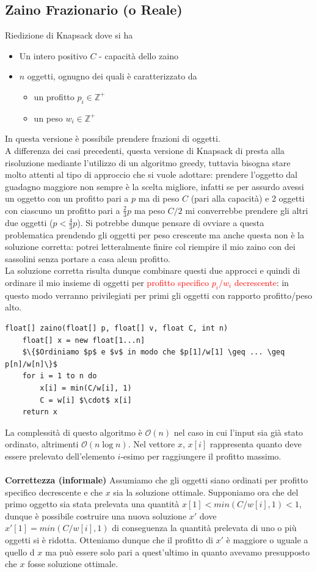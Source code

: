 \documentclass[../cheatSheetAlgoritmi.tex]{subfiles}
\begin{document}
\subsection{Zaino Frazionario (o Reale)}
Riedizione di Knapsack dove si ha
\begin{itemize}
	\item Un intero positivo $C$ - capacità dello zaino
	\item $n$ oggetti, ognugno dei quali è caratterizzato da
	\begin{itemize}
		\item un profitto $p_{i} \in \mathbb{Z}^{+}$
		\item un peso $w_{i} \in \mathbb{Z}^{+}$
	\end{itemize}
\end{itemize}
In questa versione è possibile prendere frazioni di oggetti.\\
A differenza dei casi precedenti, questa versione di Knapsack di presta alla risoluzione mediante l'utilizzo di un algoritmo greedy, tuttavia bisogna stare molto attenti al tipo di approccio che si vuole adottare: prendere l'oggetto dal guadagno maggiore non sempre è la scelta migliore, infatti se per assurdo avessi un oggetto con un profitto pari a $p$ ma di peso $C$ (pari alla capacità) e 2 oggetti con ciascuno un profitto pari a $\frac{2}{3} p$ ma peso $C/2$ mi converrebbe prendere gli altri due oggetti ($p < \frac{4}{3}p$). Si potrebbe dunque pensare di ovviare a questa problematica prendendo gli oggetti per peso crescente ma anche questa non è la soluzione corretta: potrei letteralmente finire col riempire il mio zaino con dei sassolini senza portare a casa alcun profitto.\\
La soluzione corretta risulta dunque combinare questi due approcci e quindi di ordinare il mio insieme di oggetti per \textcolor{red}{profitto specifico $p_{i}/w_{i}$ decrescente}: in questo modo verranno privilegiati per primi gli oggetti con rapporto profitto/peso alto.
\begin{lstlisting}[caption=Zaino Frazionario]
float[] zaino(float[] p, float[] v, float C, int n)
	float[] x = new float[1...n]
	$\{$Ordiniamo $p$ e $v$ in modo che $p[1]/w[1] \geq ... \geq p[n]/w[n]\}$
	for i = 1 to n do
		x[i] = min(C/w[i], 1)
		C = w[i] $\cdot$ x[i]
	return x
\end{lstlisting}
La complessità di questo algoritmo è $\mathcal{O}(n)$ nel caso in cui l'input sia già stato ordinato, altrimenti $\mathcal{O}(n \log{n})$. Nel vettore $x$, $x[i]$ rappresenta quanto deve essere prelevato dell'elemento $i$-esimo per raggiungere il profitto massimo.\\\\
\textbf{Correttezza (informale)}
Assumiamo che gli oggetti siano ordinati per profitto specifico decrescente e che $x$ sia la soluzione ottimale. Supponiamo ora che del primo oggetto sia stata prelevata una quantità $x[1] < min(C/w[i], 1) < 1$, dunque è possibile costruire una nuova soluzione $x'$ dove $x'[1] = min(C/w[i], 1)$ di conseguenza la quantità prelevata di uno o più oggetti si è ridotta. Otteniamo dunque che il profitto di $x'$ è maggiore o uguale a quello d $x$ ma può essere solo pari a quest'ultimo in quanto avevamo presupposto che $x$ fosse soluzione ottimale.
\end{document}
